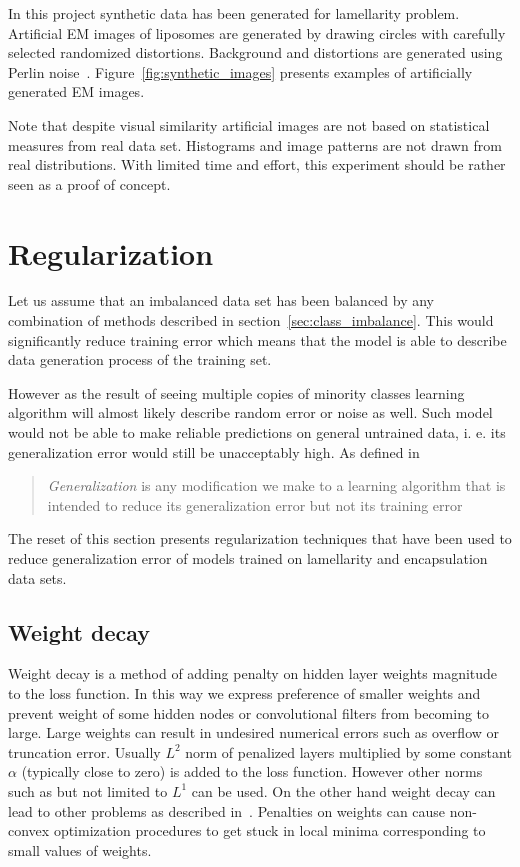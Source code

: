 \documentclass[a4paper, 11pt, table]{article}
\begin{document}
In this project synthetic data has been generated for lamellarity problem. Artificial EM images of liposomes are generated by drawing circles with carefully selected randomized distortions. Background and distortions are generated using Perlin noise~\cite{Perlin:1985:IS:325165.325247}. Figure~\ref{fig:synthetic_images} presents examples of artificially generated EM images.

Note that despite visual similarity artificial images are not based on statistical measures from real data set. Histograms and image patterns are not drawn from real distributions. With limited time and effort, this experiment should be rather seen as a proof of concept.


\section{Regularization}
\label{sec:regularization}

Let us assume that an imbalanced data set has been balanced by any combination of methods described in section~\ref{sec:class_imbalance}. This would significantly reduce training error which means that the model is able to describe data generation process of the training set. 

However as the result of seeing multiple copies of minority classes learning algorithm will almost likely describe random error or noise as well. Such model would not be able to make reliable predictions on general untrained data, i. e. its generalization error would still be unacceptably high. As defined in~\cite{dl_book} \blockquote{\textit{Generalization} is any modification we make to a learning algorithm that is intended to reduce its generalization error but not its training error}.

The reset of this section presents regularization techniques that have been used to reduce generalization error of models trained on lamellarity and encapsulation data sets.

\subsection{Weight decay}
Weight decay is a method of adding penalty on hidden layer weights magnitude to the loss function. In this way we express preference of smaller weights and prevent weight of some hidden nodes or convolutional filters from becoming to large. Large weights can result in undesired numerical errors such as overflow or truncation error. Usually $L^2$ norm of penalized layers multiplied by some constant $\alpha$ (typically close to zero) is added to the loss function. However other norms such as but not limited to $L^1$ can be used. 
On the other hand weight decay can lead to other problems as described in~\cite{dl_book}. Penalties on weights can cause non-convex optimization procedures to get stuck in local minima corresponding to small values of weights. 
\end{document}
